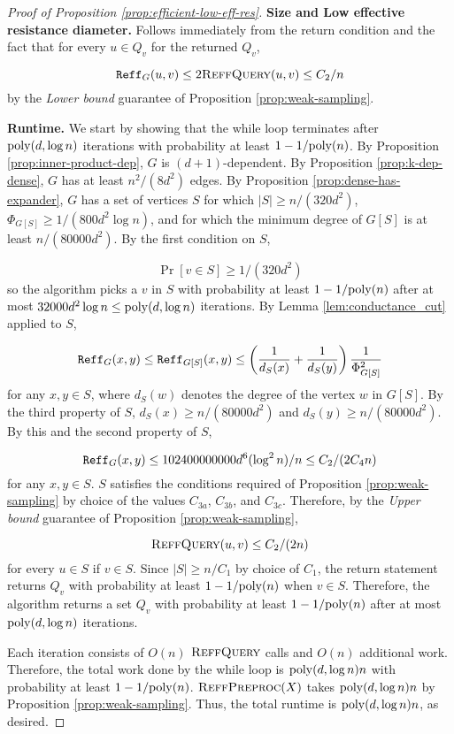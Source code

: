 \begin{proof}[Proof of Proposition \ref{prop:efficient-low-eff-res}]
\textbf{Size and Low effective resistance diameter.} Follows immediately from the return condition and the fact that for every $u\in Q_v$ for the returned $Q_v$,

$$\mathtt{Reff}_G(u,v)\le 2\textsc{ReffQuery}(u,v)\le C_2/n$$
by the \emph{Lower bound} guarantee of Proposition \ref{prop:weak-sampling}.

\textbf{Runtime.} We start by showing that the while loop terminates after $\mathrm{poly}(d,\log n)$ iterations with probability at least $1 - 1/\mathrm{poly}(n)$. By Proposition \ref{prop:inner-product-dep}, $G$ is $(d+1)$-dependent. By Proposition \ref{prop:k-dep-dense}, $G$ has at least $n^2/(8d^2)$ edges. By Proposition \ref{prop:dense-has-expander}, $G$ has a set of vertices $S$ for which $|S|\ge n/(320d^2)$, $\Phi_{G[S]} \ge 1/(800d^2\log n)$, and for which the minimum degree of $G[S]$ is at least $n/(80000d^2)$. By the first condition on $S$,

$$\Pr[v\in S] \ge 1/(320d^2)$$
so the algorithm picks a $v$ in $S$ with probability at least $1 - 1/\mathrm{poly}(n)$ after at most $32000d^2\log n\le \mathrm{poly}(d,\log n)$ iterations. By Lemma \ref{lem:conductance_cut} applied to $S$,

$$\mathtt{Reff}_G(x,y)\le \mathtt{Reff}_{G[S]}(x,y)\le \left(\frac{1}{d_S(x)} + \frac{1}{d_S(y)}\right)\frac{1}{\Phi_{G[S]}^2}$$
for any $x,y\in S$, where $d_S(w)$ denotes the degree of the vertex $w$ in $G[S]$. By the third property of $S$, $d_S(x)\ge n/(80000d^2)$ and $d_S(y)\ge n/(80000d^2)$. By this and the second property of $S$,

$$\mathtt{Reff}_G(x,y)\le 102400000000 d^6(\log^2 n)/n\le C_2/(2C_4 n)$$
for any $x,y\in S$. $S$ satisfies the conditions required of Proposition \ref{prop:weak-sampling} by choice of the values $C_{3a}$, $C_{3b}$, and $C_{3c}$. Therefore, by the \emph{Upper bound} guarantee of Proposition \ref{prop:weak-sampling},

$$\textsc{ReffQuery}(u,v)\le C_2/(2n)$$
for every $u\in S$ if $v\in S$. Since $|S|\ge n/C_1$ by choice of $C_1$, the return statement returns $Q_v$ with probability at least $1 - 1/\mathrm{poly}(n)$ when $v\in S$. Therefore, the algorithm returns a set $Q_v$ with probability at least $1 - 1/\mathrm{poly}(n)$ after at most $\mathrm{poly}(d,\log n)$ iterations.

Each iteration consists of $O(n)$ $\textsc{ReffQuery}$ calls and $O(n)$ additional work. Therefore, the total work done by the while loop is $\mathrm{poly}(d,\log n) n$ with probability at least $1 - 1/\mathrm{poly}(n)$. $\textsc{ReffPreproc}(X)$ takes $\mathrm{poly}(d,\log n) n$ by Proposition \ref{prop:weak-sampling}. Thus, the total runtime is $\mathrm{poly}(d,\log n) n$, as desired.
\end{proof}













